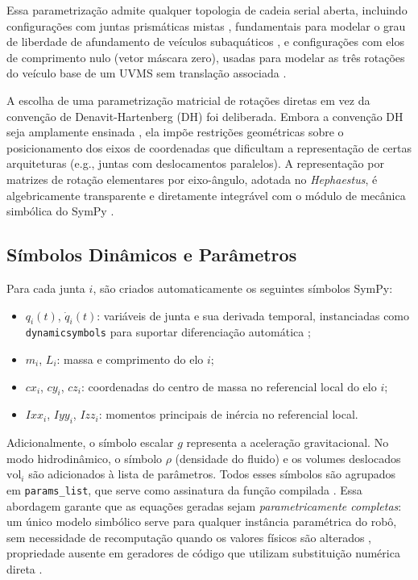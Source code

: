 Essa parametrização admite qualquer topologia de cadeia serial aberta, incluindo configurações com juntas prismáticas mistas , fundamentais para modelar o grau de liberdade de afundamento de veículos subaquáticos , e configurações com elos de comprimento nulo (vetor máscara zero), usadas para modelar as três rotações do veículo base de um UVMS sem translação associada \cite{antonelli2014modelling, fossen2011handbook}.

A escolha de uma parametrização matricial de rotações diretas em vez da convenção de Denavit-Hartenberg (DH) \cite{denavit1955kinematic} foi deliberada. Embora a convenção DH seja amplamente ensinada \cite{craig1989introduction, spong2020robot}, ela impõe restrições geométricas sobre o posicionamento dos eixos de coordenadas que dificultam a representação de certas arquiteturas (e.g., juntas com deslocamentos paralelos). A representação por matrizes de rotação elementares por eixo-ângulo, adotada no \textit{Hephaestus}, é algebricamente transparente e diretamente integrável com o módulo de mecânica simbólica do SymPy \cite{meurer2017sympy, leu1986automated}.

\subsection{Símbolos Dinâmicos e Parâmetros}

Para cada junta $i$, são criados automaticamente os seguintes símbolos SymPy:

\begin{itemize}
    \item $q_i(t)$, $\dot{q}_i(t)$: variáveis de junta e sua derivada temporal, instanciadas como \texttt{dynamicsymbols} para suportar diferenciação automática \cite{meurer2017sympy};
    \item $m_i$, $L_i$: massa e comprimento do elo $i$;
    \item $cx_i$, $cy_i$, $cz_i$: coordenadas do centro de massa no referencial local do elo $i$;
    \item $Ixx_i$, $Iyy_i$, $Izz_i$: momentos principais de inércia no referencial local.
\end{itemize}

Adicionalmente, o símbolo escalar $g$ representa a aceleração gravitacional. No modo hidrodinâmico, o símbolo $\rho$ (densidade do fluido) e os volumes deslocados $\text{vol}_i$ são adicionados à lista de parâmetros. Todos esses símbolos são agrupados em \texttt{params\_list}, que serve como assinatura da função compilada \cite{meurer2017sympy}. Essa abordagem garante que as equações geradas sejam \emph{parametricamente completas}: um único modelo simbólico serve para qualquer instância paramétrica do robô, sem necessidade de recomputação quando os valores físicos são alterados , propriedade ausente em geradores de código que utilizam substituição numérica direta \cite{hollerbach1980recursive}.

